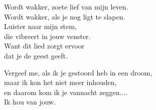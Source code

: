 \clearpage
\begin{translation}
Wordt wakker, zoete lief van mijn leven.\\
Wordt wakker, als je nog ligt te slapen.\\
Luister naar mijn stem,\\
die vibreert in jouw venster.\\
Want dit lied zorgt ervoor\\
dat je de geest geeft.\vspace{\wlskip}

Vergeef me, als ik je gestoord heb in een droom,\\
maar ik kon het niet meer inhouden,\\
en daarom kom ik je vannacht zeggen....\\
Ik hou van jouw.\\
\end{translation}
